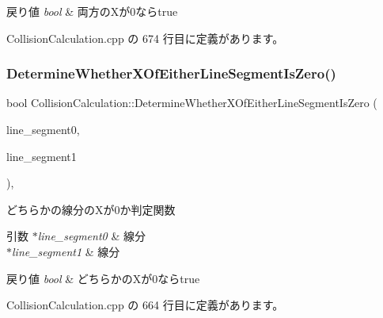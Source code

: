 \begin{DoxyRetVals}{戻り値}
{\em bool} & 両方の\+Xが0ならtrue \\
\hline
\end{DoxyRetVals}


 Collision\+Calculation.\+cpp の 674 行目に定義があります。

\mbox{\label{class_collision_calculation_a7dffad18d15ed6e7a2e43888398afeeb}} 
\subsubsection{\texorpdfstring{Determine\+Whether\+X\+Of\+Either\+Line\+Segment\+Is\+Zero()}{DetermineWhetherXOfEitherLineSegmentIsZero()}}
{\footnotesize\ttfamily bool Collision\+Calculation\+::\+Determine\+Whether\+X\+Of\+Either\+Line\+Segment\+Is\+Zero (\begin{DoxyParamCaption}\item[{\mbox{\hyperlink{class_line_segment}{Line\+Segment}} $\ast$}]{line\+\_\+segment0,  }\item[{\mbox{\hyperlink{class_line_segment}{Line\+Segment}} $\ast$}]{line\+\_\+segment1 }\end{DoxyParamCaption})\hspace{0.3cm}{\ttfamily [static]}, {\ttfamily [private]}}



どちらかの線分の\+Xが0か判定関数 


\begin{DoxyParams}{引数}
{\em $\ast$line\+\_\+segment0} & 線分 \\
\hline
{\em $\ast$line\+\_\+segment1} & 線分 \\
\hline
\end{DoxyParams}

\begin{DoxyRetVals}{戻り値}
{\em bool} & どちらかの\+Xが0ならtrue \\
\hline
\end{DoxyRetVals}


 Collision\+Calculation.\+cpp の 664 行目に定義があります。

